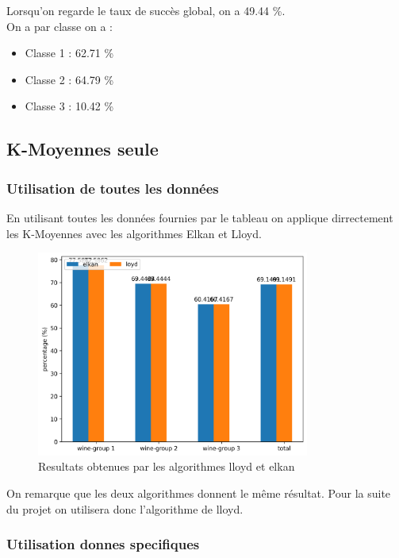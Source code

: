 \documentclass[a4paper,12pt]{article}
\begin{document}
Lorsqu'on regarde le taux de succès global, on a 49.44 \%.\\

On a par classe on a :
\begin{itemize}
\item Classe 1 : 62.71 \%
\item Classe 2 : 64.79 \%
\item Classe 3 : 10.42 \%
\end{itemize}

\subsection{K-Moyennes seule}
\subsubsection{Utilisation de toutes les données}
En utilisant toutes les données fournies par le tableau on applique dirrectement les K-Moyennes avec les algorithmes Elkan et Lloyd.

\begin{figure}[h!] %
   \centering
   \includegraphics[width=0.8\textwidth]{comparaison_algos.png} %
   \caption{Resultats obtenues par les algorithmes lloyd et elkan}
   \label{comparaison_algos.png} %
\end{figure}

On remarque que les deux algorithmes donnent le même résultat. Pour la suite du projet on utilisera donc l'algorithme de lloyd.

\subsubsection{Utilisation donnes specifiques}
\end{document}
